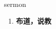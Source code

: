 
\begin{frame}
{\huge sermon}
\begin{center}
\begin{enumerate}\Large
  \item \textbf{布道，说教}
\end{enumerate}
\end{center}
\end{frame}
